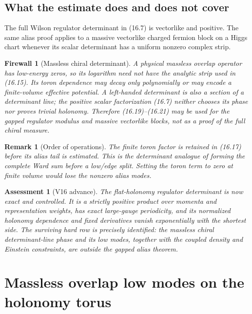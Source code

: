 \documentclass[11pt]{article}
\newtheorem{remark}[theorem]{Remark}
\newtheorem{assessment}[theorem]{Assessment}
\newtheorem{firewall}[theorem]{Firewall}
\begin{document}
\subsection{What the estimate does and does not cover}

The full Wilson regulator determinant in (16.7) is vectorlike and
positive.  The same alias proof applies to a massive vectorlike charged
fermion block on a Higgs chart whenever its scalar determinant has a
uniform nonzero complex strip.

\begin{firewall}[Massless chiral determinant]
\label{fw:v11v16-chiral}
A physical massless overlap operator has low-energy zeros, so its
logarithm need not have the analytic strip used in (16.15).  Its toron
dependence may decay only polynomially or may encode a finite-volume
effective potential.  A left-handed determinant is also a section of a
determinant line; the positive scalar factorization (16.7) neither chooses
its phase nor proves trivial holonomy.  Therefore (16.19)--(16.21) may be
used for the gapped regulator modulus and massive vectorlike blocks, not
as a proof of the full chiral measure.
\end{firewall}

\begin{remark}[Order of operations]
\label{rem:v11v16-order}
The finite toron factor is retained in (16.17) before its alias tail is
estimated.  This is the determinant analogue of forming the complete Ward
sum before a low/edge split.  Setting the toron term to zero at finite
volume would lose the nonzero alias modes.
\end{remark}

\begin{assessment}[V16 advance]
\label{ass:v11v16}
The flat-holonomy regulator determinant is now exact and controlled.  It
is a strictly positive product over momenta and representation weights,
has exact large-gauge periodicity, and its normalized holonomy dependence
and fixed derivatives vanish exponentially with the shortest side.
The surviving hard row is precisely identified: the massless chiral
determinant-line phase and its low modes, together with the coupled
density and Einstein constraints, are outside the gapped alias theorem.
\end{assessment}


\section{Massless overlap low modes on the holonomy torus}
\label{sec:v11v17}
\end{document}
